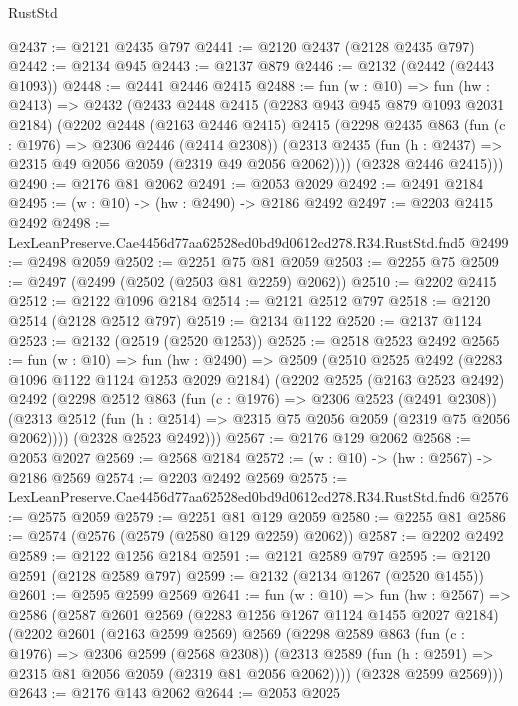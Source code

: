 \begin{lexlean}{RustStd}
\begin{coremodule}
@2437 := @2121 @2435 @797
@2441 := @2120 @2437 (@2128 @2435 @797)
@2442 := @2134 @945
@2443 := @2137 @879
@2446 := @2132 (@2442 (@2443 @1093))
@2448 := @2441 @2446 @2415
@2488 := fun (w : @10) =>
  fun (hw : @2413) =>
  @2432
    (@2433
      @2448
      @2415
      (@2283 @943 @945 @879 @1093 @2031 @2184)
      (@2202
        @2448
        (@2163 @2446 @2415)
        @2415
        (@2298
          @2435
          @863
          (fun (c : @1976) => @2306 @2446 (@2414 @2308))
          (@2313 @2435 (fun (h : @2437) => @2315 @49 @2056 @2059 (@2319 @49 @2056 @2062))))
        (@2328 @2446 @2415)))
@2490 := @2176 @81 @2062
@2491 := @2053 @2029
@2492 := @2491 @2184
@2495 := (w : @10) -> (hw : @2490) -> @2186 @2492
@2497 := @2203 @2415 @2492
@2498 := LexLeanPreserve.Cae4456d77aa62528ed0bd9d0612cd278.R34.RustStd.fnd5
@2499 := @2498 @2059
@2502 := @2251 @75 @81 @2059
@2503 := @2255 @75
@2509 := @2497 (@2499 (@2502 (@2503 @81 @2259) @2062))
@2510 := @2202 @2415
@2512 := @2122 @1096 @2184
@2514 := @2121 @2512 @797
@2518 := @2120 @2514 (@2128 @2512 @797)
@2519 := @2134 @1122
@2520 := @2137 @1124
@2523 := @2132 (@2519 (@2520 @1253))
@2525 := @2518 @2523 @2492
@2565 := fun (w : @10) =>
  fun (hw : @2490) =>
  @2509
    (@2510
      @2525
      @2492
      (@2283 @1096 @1122 @1124 @1253 @2029 @2184)
      (@2202
        @2525
        (@2163 @2523 @2492)
        @2492
        (@2298
          @2512
          @863
          (fun (c : @1976) => @2306 @2523 (@2491 @2308))
          (@2313 @2512 (fun (h : @2514) => @2315 @75 @2056 @2059 (@2319 @75 @2056 @2062))))
        (@2328 @2523 @2492)))
@2567 := @2176 @129 @2062
@2568 := @2053 @2027
@2569 := @2568 @2184
@2572 := (w : @10) -> (hw : @2567) -> @2186 @2569
@2574 := @2203 @2492 @2569
@2575 := LexLeanPreserve.Cae4456d77aa62528ed0bd9d0612cd278.R34.RustStd.fnd6
@2576 := @2575 @2059
@2579 := @2251 @81 @129 @2059
@2580 := @2255 @81
@2586 := @2574 (@2576 (@2579 (@2580 @129 @2259) @2062))
@2587 := @2202 @2492
@2589 := @2122 @1256 @2184
@2591 := @2121 @2589 @797
@2595 := @2120 @2591 (@2128 @2589 @797)
@2599 := @2132 (@2134 @1267 (@2520 @1455))
@2601 := @2595 @2599 @2569
@2641 := fun (w : @10) =>
  fun (hw : @2567) =>
  @2586
    (@2587
      @2601
      @2569
      (@2283 @1256 @1267 @1124 @1455 @2027 @2184)
      (@2202
        @2601
        (@2163 @2599 @2569)
        @2569
        (@2298
          @2589
          @863
          (fun (c : @1976) => @2306 @2599 (@2568 @2308))
          (@2313 @2589 (fun (h : @2591) => @2315 @81 @2056 @2059 (@2319 @81 @2056 @2062))))
        (@2328 @2599 @2569)))
@2643 := @2176 @143 @2062
@2644 := @2053 @2025

\end{coremodule}
\end{lexlean}
